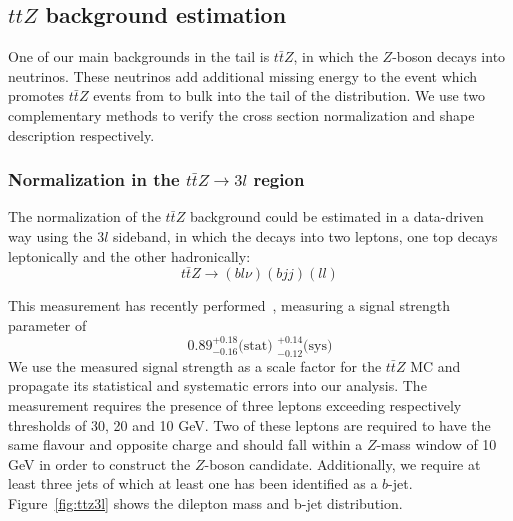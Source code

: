 \subsection{\texorpdfstring{$ttZ$}{TTZ} background estimation}

  One of our main backgrounds in the \mtll tail is $t\bar{t}Z$, in which the $Z$-boson decays into neutrinos. These neutrinos add additional missing energy to the event which promotes $t\bar{t}Z$ events
  from to bulk into the tail of the \mtll distribution. We use two complementary methods to verify the cross section normalization and \mtll shape description respectively.

  \subsubsection{Normalization in the \texorpdfstring{$t\bar{t}Z \to 3l$}{ttZ->3l} region}

    The normalization of the $t\bar{t}Z$ background could be estimated in a data-driven way using the $3l$ sideband, in which the \Z decays into two leptons, one top decays leptonically and the other hadronically:
    \begin{equation}
      t\bar{t}Z \to (bl\nu) (bjj) (ll) \nonumber 
    \end{equation}

    This measurement has recently performed~\citep{CMS-PAS-TOP-16-017}, measuring a signal strength parameter of 
    \begin{equation}
     0.89^{+0.18}_{-0.16} \text{(stat) }^{+0.14}_{-0.12}\text{(sys)}
    \end{equation}
    We use the measured
    signal strength as a scale factor for the $t\bar{t}Z$ MC and propagate its statistical and systematic errors into our analysis.
    The measurement requires the presence of three leptons exceeding respectively \pt thresholds of 30, 20 and 10 GeV.
    Two of these leptons are required to have the same flavour and opposite charge and should fall within a $Z$-mass window of 10 GeV in order to construct the $Z$-boson candidate.
    Additionally, we require at least three jets of which at least one has been identified as a $b$-jet.
    Figure~\ref{fig:ttz3l} shows the dilepton mass and b-jet distribution.


